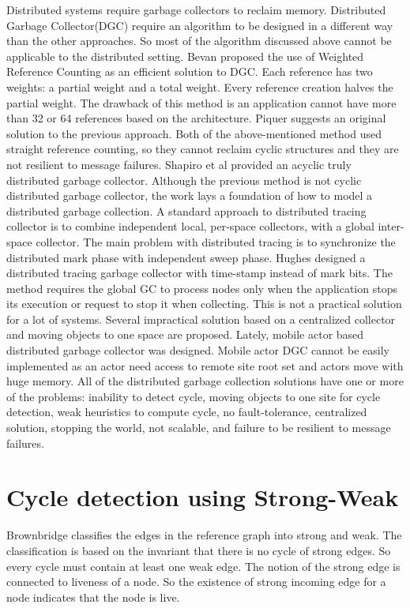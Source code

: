 Distributed systems require garbage collectors to reclaim memory. Distributed Garbage Collector(DGC) require an algorithm to be designed in a different way than the other approaches. So most of the algorithm discussed above cannot be applicable to the distributed setting. Bevan\cite{Bevan87} proposed the use of Weighted Reference Counting as an efficient solution to DGC. Each reference has two weights: a partial weight and a total weight. Every reference creation halves the partial weight. The drawback of this method is an application cannot have more than 32 or 64 references based on the architecture. Piquer\cite{piquer91} suggests an original solution to the previous approach. Both of the above-mentioned method used straight reference counting, so they cannot reclaim cyclic structures and they are not resilient to message failures. Shapiro et al \cite{Shapiro92} provided an acyclic truly distributed garbage collector. Although the previous method is not cyclic distributed garbage collector, the work lays a foundation of how to model a  distributed garbage collection. A standard approach to distributed tracing collector is to combine independent local, per-space collectors, with a global inter-space collector. The main problem with distributed tracing is to synchronize the distributed mark phase with independent sweep phase\cite{plain95}. Hughes designed a distributed tracing garbage collector with  time-stamp instead of mark bits\cite{hugh85}. The method requires the global GC to process nodes only when the application stops its execution or request to stop it when collecting. This is not a practical solution for a lot of systems. Several impractical solution based on a centralized collector and moving objects to one space are proposed\cite{Maheshwari1997,Maheshwari1997b,Liskov,Ladin,Veiga05}. Lately, mobile actor based distributed garbage collector was designed\cite{want}. Mobile actor DGC cannot be easily implemented as an actor need access to remote site root set and actors move with huge memory.  All of the distributed garbage collection solutions have one or more of the problems: inability to detect cycle, moving objects to one site for cycle detection, weak heuristics to compute cycle, no fault-tolerance, centralized solution, stopping the world, not scalable, and failure to be resilient to message failures.


\section{Cycle detection using Strong-Weak}
Brownbridge classifies the edges in the reference graph into strong and weak. The classification is based on the invariant that there is no cycle of strong edges. So every cycle must contain at least one weak edge. The notion of the strong edge is connected to liveness of a node. So  the existence of strong incoming edge for a node indicates that the node is live. 

